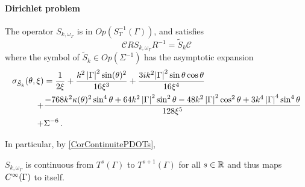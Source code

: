 \documentclass[a4paper]{article}
\begin{document}
\paragraph{Dirichlet problem}

\begin{Lem}
	\label{LemsymbolSk}
	The operator $S_{k,\omega_\Gamma}$ is in $\textit{Op}(S^{-1}_T(\Gamma))$, and satisfies	
	\[\mathcal{C}RS_{k,\omega_\Gamma}R^{-1} = \tilde{S}_k \mathcal{C}\]
	where the symbol of $\tilde{S}_k \in \textit{Op}(\Sigma^{-1})$ has the asymptotic expansion
	\begin{equation}
		\begin{split}
		\sigma_{\tilde{S}_k}(\theta,\xi)&=\displaystyle \frac{1}{2\xi}+\frac{k^2\left\lvert \Gamma \right\rvert^2\sin(\theta)^2}{16\xi^3}+{\frac {3i{k}^{2}{\left\lvert \Gamma \right\rvert}^{2}\sin \theta \cos \theta }{16{\xi}^{4}}}\\
		+ &\frac{-768 k^2 \kappa(\theta)^2 \sin^4\theta + 64k^2\left\lvert \Gamma \right\rvert^2 \sin^2 \theta - 48k^2\left\lvert \Gamma \right\rvert^2 \cos^2\theta + 3k^4 \left\lvert \Gamma \right\rvert^4 \sin^4\theta}{128 \xi^5}\\
		+ & \Sigma^{-6}\,.
		\end{split}
		\label{symboleSk}
	\end{equation}
\end{Lem}
In particular, by \autoref{CorContinuitePDOTs},
\begin{Cor}
	$S_{k,\omega_\Gamma}$ is continuous from $T^s(\Gamma)$ to $T^{s+1}(\Gamma)$ for all $s\in \mathbb{R}$ and thus maps $C^{\infty}(\Gamma)$ to itself. 
\end{Cor}
\end{document}
